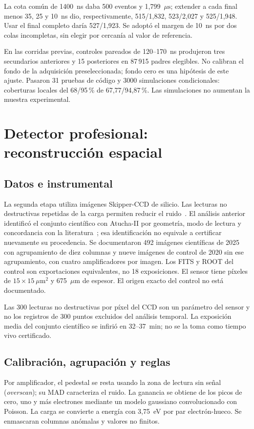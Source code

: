 \documentclass[10pt,a4paper]{article}
\newcommand{\us}{\ensuremath{\mu\mathrm{s}}}
\begin{document}
La cota común de 1400~ns daba 500 eventos y 1{,}799~\us; extender a cada final menos 35, 25 y 10~ns dio, respectivamente, 515/1{,}832, 523/2{,}027 y 525/1{,}948. Usar el final completo daría 527/1{,}923. Se adoptó el margen de 10~ns por dos colas incompletas, sin elegir por cercanía al valor de referencia.

En las corridas previas, controles pareados de 120--170~ns produjeron tres secundarios anteriores y 15 posteriores en 87\,915 padres elegibles. No calibran el fondo de la adquisición preseleccionada; fondo cero es una hipótesis de este ajuste. Pasaron 31 pruebas de código y 3000 simulaciones condicionales: coberturas locales del 68/95\,\% de 67{,}77/94{,}87\,\%. Las simulaciones no aumentan la muestra experimental.

\newpage
\section{Detector profesional: reconstrucción espacial}
\subsection*{Datos e instrumental}
La segunda etapa utiliza imágenes Skipper-CCD de silicio. Las lecturas no destructivas repetidas de la carga permiten reducir el ruido~\cite{skipper}. El análisis anterior identificó el conjunto científico con Atucha-II por geometría, modo de lectura y concordancia con la literatura~\cite{atucha}; esa identificación no equivale a certificar nuevamente su procedencia.
Se documentaron 492 imágenes científicas de 2025 con agrupamiento de diez columnas y nueve imágenes de control de 2020 sin ese agrupamiento, con cuatro amplificadores por imagen. Los FITS y ROOT del control son exportaciones equivalentes, no 18 exposiciones. El sensor tiene píxeles de $15\times15~\mu$m$^2$ y 675~$\mu$m de espesor. El origen exacto del control no está documentado.

Las 300 lecturas no destructivas por píxel del CCD son un parámetro del sensor y no los registros de 300 puntos excluidos del análisis temporal. La exposición media del conjunto científico se infirió en 32--37~min; no se la toma como tiempo vivo certificado.

\subsection*{Calibración, agrupación y reglas}
Por amplificador, el pedestal se resta usando la zona de lectura sin señal (\emph{overscan}); su MAD caracteriza el ruido. La ganancia se obtiene de los picos de cero, uno y más electrones mediante un modelo gaussiano convolucionado con Poisson. La carga se convierte a energía con 3{,}75~eV por par electrón-hueco. Se enmascaran columnas anómalas y valores no finitos.
\end{document}
